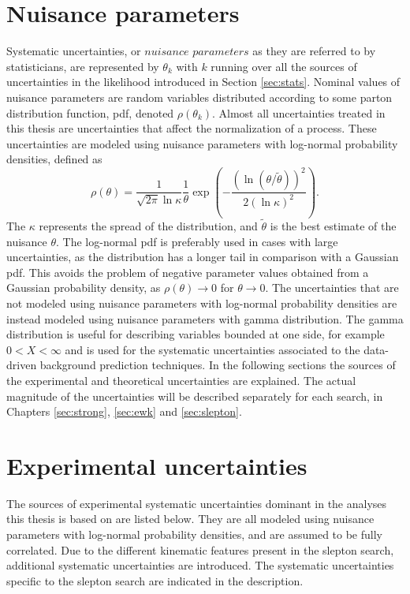 \section{Nuisance parameters}
\noindent\justify
Systematic uncertainties, or $nuisance$ $parameters$ as they are referred to by statisticians, are represented by $\theta_{k}$ with $k$ running over all the sources of uncertainties \cite{Lista:2016chp} in the likelihood introduced in Section \ref{sec:stats}.                                         
Nominal values of nuisance parameters are random variables distributed according to some parton distribution function, pdf, denoted $\rho(\theta_{k})$. 
Almost all uncertainties treated in this thesis are uncertainties that affect the normalization of a process. 
These uncertainties are modeled using nuisance parameters with log-normal probability densities, defined as
\begin{equation}
\rho(\theta)=\frac{1}{\sqrt{2\pi}\ln \kappa }\frac{1}{\theta}\exp\left(-\frac{(\ln(\theta/\tilde{\theta}))^{2}}{2(\ln \kappa)^{2}}\right).
\end{equation}   
The $\kappa$ represents the spread of the distribution, and $\tilde{\theta}$ is the best estimate of the nuisance $\theta$. 
The log-normal pdf is preferably used in cases with large uncertainties, as the distribution has a longer tail in comparison with a Gaussian pdf. 
This avoids the problem of negative parameter values obtained from a Gaussian probability density, as $\rho(\theta)\rightarrow0$ for $\theta\rightarrow0$.
The uncertainties that are not modeled using nuisance parameters with log-normal probability densities are instead modeled using nuisance parameters with gamma distribution.
The gamma distribution is useful for describing variables bounded at one side, for example $0<X<\infty$ and is used for the systematic uncertainties associated to the data-driven background prediction techniques. 
\newpara
\noindent\justify
In the following sections the sources of the experimental and theoretical uncertainties are explained. 
The actual magnitude of the uncertainties will be described separately for each search, in Chapters \ref{sec:strong}, \ref{sec:ewk} and \ref{sec:slepton}. 
\section{Experimental uncertainties}
\noindent\justify
The sources of experimental systematic uncertainties dominant in the analyses this thesis is based on are listed below. 
They are all modeled using nuisance parameters with log-normal probability densities, and are assumed to be fully correlated. 
Due to the different kinematic features present in the slepton search, additional systematic uncertainties are introduced. 
The systematic uncertainties specific to the slepton search are indicated in the description. 
